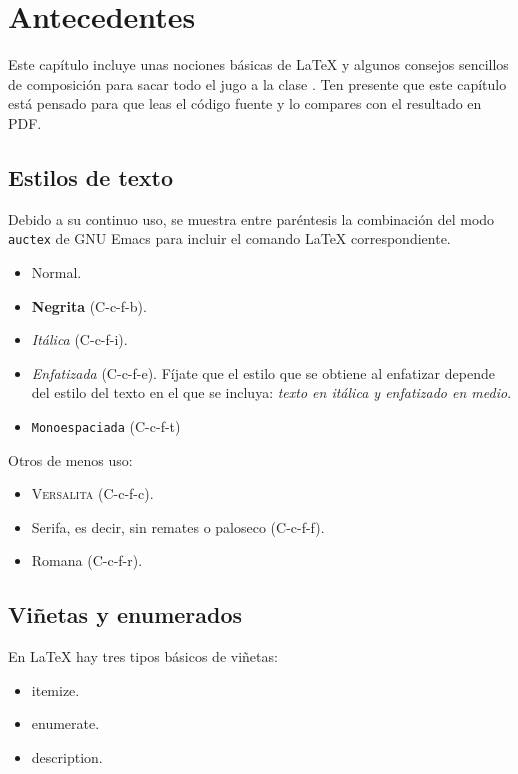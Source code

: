 \chapter{Antecedentes}
\label{chap:antecedentes}

Este capítulo incluye unas nociones básicas de \LaTeX{} y algunos consejos
sencillos de composición para sacar todo el jugo a la clase \esitfg. Ten
presente que este capítulo está pensado para que leas el código fuente y lo
compares con el resultado en PDF.

\section{Estilos de texto}

Debido a su continuo uso, se muestra entre paréntesis la combinación del modo
\texttt{auctex} de GNU Emacs para incluir el comando \LaTeX{} correspondiente.

\begin{itemize}
\item Normal.
\item \textbf{Negrita} (C-c-f-b).
\item \textit{Itálica} (C-c-f-i).
\item \emph{Enfatizada} (C-c-f-e). Fíjate que el estilo que se obtiene al
  enfatizar depende del estilo del texto en el que se incluya: \textit{texto en
    itálica y \emph{enfatizado} en medio}.
\item \texttt{Monoespaciada} (C-c-f-t)
\end{itemize}

Otros de menos uso:

\begin{itemize}
\item \textsc{Versalita} (C-c-f-c).
\item \textsf{Serifa}, es decir, sin remates o paloseco (C-c-f-f).
\item \textrm{Romana} (C-c-f-r).
\end{itemize}


\section{Viñetas y enumerados}

En \LaTeX{} hay tres tipos básicos de viñetas:

\begin{itemize}
\item itemize.
\item enumerate.
\item description.
\end{itemize}


